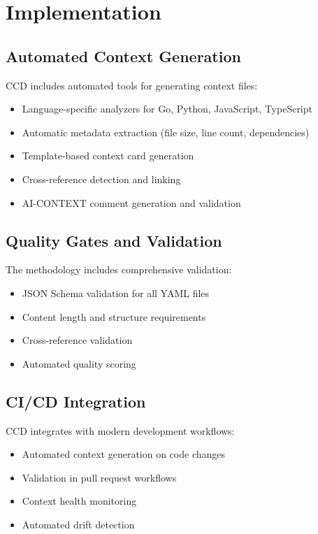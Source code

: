 \documentclass[11pt,a4paper]{article}
\begin{document}
\section{Implementation}

\subsection{Automated Context Generation}

CCD includes automated tools for generating context files:

\begin{itemize}
    \item Language-specific analyzers for Go, Python, JavaScript, TypeScript
    \item Automatic metadata extraction (file size, line count, dependencies)
    \item Template-based context card generation
    \item Cross-reference detection and linking
    \item AI-CONTEXT comment generation and validation
\end{itemize}

\subsection{Quality Gates and Validation}

The methodology includes comprehensive validation:

\begin{itemize}
    \item JSON Schema validation for all YAML files
    \item Content length and structure requirements
    \item Cross-reference validation
    \item Automated quality scoring
\end{itemize}

\subsection{CI/CD Integration}

CCD integrates with modern development workflows:

\begin{itemize}
    \item Automated context generation on code changes
    \item Validation in pull request workflows
    \item Context health monitoring
    \item Automated drift detection
\end{itemize}
\end{document}
